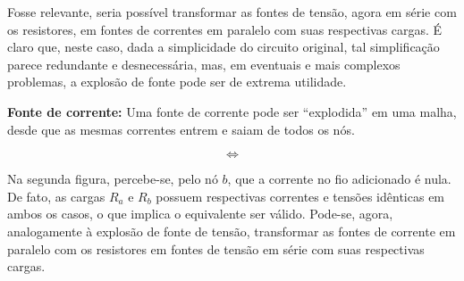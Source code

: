 \documentclass{article}
\numberwithin{equation}{section}
\newlength\Colsep
\begin{document}
Fosse relevante, seria possível transformar as fontes de tensão, agora em série com os resistores, em fontes de correntes em paralelo com suas respectivas cargas. É claro que, neste caso, dada a simplicidade do circuito original, tal simplificação parece redundante e desnecessária, mas, em eventuais e mais complexos problemas, a explosão de fonte pode ser de extrema utilidade.

\vspace{2mm}

\textbf{Fonte de corrente:} Uma fonte de corrente pode ser ``explodida'' em uma malha, desde que as mesmas correntes entrem e saiam de todos os nós.

\begin{center}
\noindent\begin{minipage}{0.8\textwidth}
\begin{minipage}[c][5cm][c]{\dimexpr0.45\textwidth-0.5\Colsep\relax}
    \begin{center}
    \end{center}
\end{minipage} \hfill
\begin{minipage}[c][5cm][c]{\dimexpr0.1\textwidth-0.5\Colsep\relax}
    $$\iff$$
\end{minipage} \hfill
\begin{minipage}[c][5cm][c]{\dimexpr0.45\textwidth-0.5\Colsep\relax}
    \begin{center}
    \end{center}
\end{minipage}
\end{minipage}
\end{center}

Na segunda figura, percebe-se, pelo nó $b$, que a corrente no fio adicionado é nula. De fato, as cargas $R_a$ e $R_b$ possuem respectivas correntes e tensões idênticas em ambos os casos, o que implica o equivalente ser válido. Pode-se, agora, analogamente à explosão de fonte de tensão, transformar as fontes de corrente em paralelo com os resistores em fontes de tensão em série com suas respectivas cargas.
\end{document}
